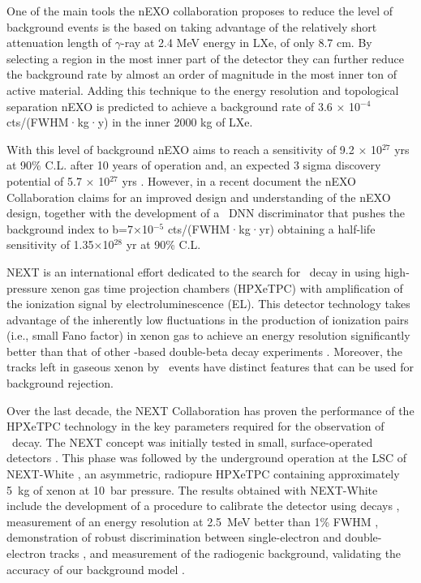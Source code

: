 One of the main tools the nEXO collaboration proposes to reduce the level of background events is the based on taking advantage of the relatively short attenuation length of $\gamma$-ray at 2.4 MeV energy in LXe, of only 8.7 cm. By selecting a region in the most inner part of the detector they can further reduce the background rate by almost an order of magnitude in the most inner ton of active material. Adding this technique to the energy resolution and topological separation nEXO is predicted to achieve a background rate of 3.6 × 10$^{-4}$ cts/(FWHM·kg·y) in the inner 2000 kg of LXe. 

With this level of background nEXO aims to reach a sensitivity of 9.2 × 10$^{27}$ yrs at 90\% C.L. after 10 years of operation and, an expected 3 sigma discovery potential of 5.7 × 
10$^{27}$ yrs \cite{nexocprecdr}. However, in a recent document \cite{nEXO:2021ujk} the nEXO Collaboration claims for an improved design and understanding of the nEXO design, together with the development of a \bbonu\ DNN discriminator that pushes the background index to 
b=7×10$^{-5}$ cts/(FWHM·kg·yr) obtaining a half-life sensitivity of 1.35×10$^{28}$ 
yr at 90\% C.L.

NEXT is an international effort dedicated to the search for \bbonu\ decay in  using high-pressure xenon gas time projection chambers (HPXeTPC) with amplification of the ionization signal by electroluminescence (EL). This detector technology takes advantage of the inherently low fluctuations in the production of ionization pairs (i.e., small Fano factor) in xenon gas to achieve an energy resolution significantly better than that of other -based double-beta decay experiments \cite{Nygren:2009zz}. Moreover, the tracks left in gaseous xenon by \bbonu\ events have distinct features that can be used for background rejection. 

Over the last decade, the NEXT Collaboration has proven the performance of the HPXeTPC technology in the key parameters required for the observation of \bbonu\ decay. The NEXT concept was initially tested in small, surface-operated detectors \cite{Alvarez:2012kua, Alvarez:2012xda, Alvarez:2013gxa, Lorca:2014sra, Ferrario:2015kta}. This phase was followed by the underground operation at the LSC of NEXT-{\sc White} \cite{Monrabal:2018xlr}, an asymmetric, radiopure HPXeTPC containing approximately 5~kg of xenon at 10~bar pressure. The results obtained with NEXT-{\sc White} include the development of a procedure to calibrate the detector using  decays \cite{Martinez-Lema:2018ibw}, measurement of an energy resolution at 2.5~MeV better than 1\% FWHM \cite{Renner:2018ttw, Renner:2019pfe}, demonstration of robust discrimination between single-electron and double-electron tracks \cite{Ferrario:2019kwg}, and measurement of the radiogenic background, validating the accuracy of our background model \cite{Novella:2018ewv,Novella:2019cne}.

